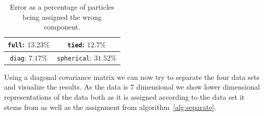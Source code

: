 \begin{table}[h!]
	\centering
	\begin{tabular}{|c|c|}
		\hline
		\texttt{full}: $13.23\%$ & \texttt{tied}: $12.7\%$ \\
		\hline
		\texttt{diag}: $7.17\%$ & \texttt{spherical}: $31.52\%$ \\
		\hline
	\end{tabular}
	\label{tab:covariance_type_comparison}
	\caption{Error as a percentage of particles being assigned the wrong component.}
\end{table}

Using a diagonal covariance matrix we can now try to separate the four data sets and visualize the results. As the data is 7 dimensional we show lower dimensional representations of the data both as it is assigned according to the data set it stems from as well as the assignment from algorithm~\ref{alg:separate}.


